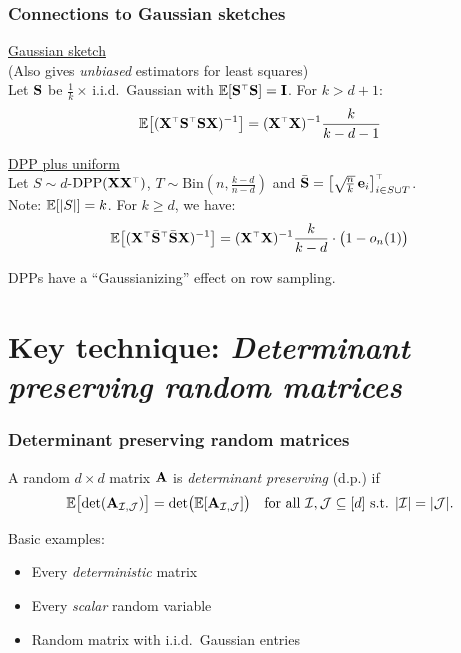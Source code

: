 \documentclass[handout]{beamer}
\begin{document}
\begin{frame}
  \frametitle{Connections to Gaussian sketches}
  \underline{Gaussian sketch}\\
  (Also gives \textit{unbiased} estimators for least squares)\\[2mm] \pause
  Let $\S$ be $\frac1{k}\times$\,i.i.d.~Gaussian with $\E[\S^\top\S]=\I$. For $k>d+1$:
  \begin{align*}
\E\big[(\X^\top\S^\top\S\X)^{-1}\big] = (\X^\top\X)^{-1}\frac{k}{k-d-1}
  \end{align*}
  \pause\vspace{3mm}

  \underline{DPP plus uniform}\\
  Let $S\sim d$-$\DPP(\X\X^\top)$, 
  $T\sim\mathrm{Bin}(n,\frac{k-d}{n-d})$ and
$\bar\S = \big[\sqrt{\!\frac nk}\,\e_i\big]_{i\in S\cup
  T}^\top$. \\
Note: $\E[|S|]=k$. For $k\geq d$, we have:
  \begin{align*}
    \E\big[(\X^\top\bar\S^\top\bar\S\X)^{-1}\big] =
    (\X^\top\X)^{-1}\frac{k}{k-d}\cdot \big(1-o_n(1)\big)
  \end{align*}
  \pause
  \begin{block}{}
    DPPs have a ``Gaussianizing'' effect on row sampling.
  \end{block}
\end{frame}

\section{Key technique: \textit{Determinant preserving random matrices}}

\begin{frame}
  \frametitle{Determinant preserving random matrices}
\begin{definition}
A random $d\times d$ matrix $\A$ is \emph{determinant preserving} (d.p.) if
\begin{align*}
  \E\big[\!\det(\A_{\Ic,\Jc})\big] =
  \det\!\big(\E[\A_{\Ic,\Jc}]\big)\quad \text{for all }\Ic,\Jc\subseteq
  [d]\text{ s.t. }|\Ic|=|\Jc|.
\end{align*}
\vspace{-7mm}
\end{definition}
\vspace{5mm}

Basic examples: \pause
\begin{itemize}
\item Every \textit{deterministic} matrix \pause
\item Every \textit{scalar} random variable \pause
\item Random matrix with i.i.d.~Gaussian entries
\end{itemize}
\end{frame}
\end{document}
